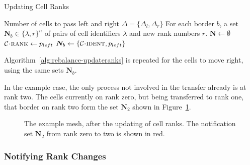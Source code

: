 \documentclass[twoside]{IIBproject}
\newcommand{\vect} [1] {\bm{#1}}
\newcommand{\acc}{{\mkern 0.5mu\cdot\mkern 0.5mu}}
\numberwithin{figure}{section}
\begin{document}
            \begin{algorithm}[!htbp]
                \caption{Updating Cell Ranks}
                \label{alg:rebalance-updateranks}

                \begin{algorithmic}
                    \Require Number of cells to pass left and right $\Delta = \{\Delta_l,\Delta_r\}$
                    \Ensure For each border $b$, a set $\vect{N}_b \in \{\lambda,r\}^n$ of pairs of cell identifiers $\lambda$ and new rank numbers $r$.
                    \Statex
                    \State $\vect{N} \gets \emptyset$
                        \State $\mathcal{C} \acc \textproc{rank} \gets p_{left}$
                                \State $\vect{N}_b \gets \{\mathcal{C} \acc \textproc{ident} , p_{left}\}$
                            \EndIf
                        \EndFor
                    \EndFor
                \end{algorithmic}
            \end{algorithm}

            Algorithm~\ref{alg:rebalance-updateranks} is repeated for the cells to move right, using the same sets $\vect{N}_b$.

            In the example case, the only process not involved in the transfer already is at rank two. The cells currently on rank zero, but being transferred to rank one, that border on rank two form the set $\vect{N}_2$ shown in Figure~\ref{fig:rebalance-notify}.

            \begin{figure}[!htbp]
                
                \caption{The example mesh, after the updating of cell ranks. The notification set $\vect{N}_2$ from rank zero to two is shown in red.}
                \label{fig:rebalance-notify}
            \end{figure}



        \subsubsection{Notifying Rank Changes} %
            \label{sec:rebalancing-notifyrank}
\end{document}
